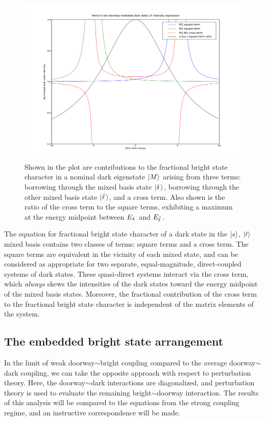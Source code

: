 \begin{figure}
  \caption{Shown in the plot are contributions to the fractional
    bright state character in a nominal dark eigenstate $\mathinner{|{M}\rangle}$
    arising from three terms: borrowing through the mixed basis state
    $\mathinner{|{\tilde{s}\,}\rangle}$, borrowing through the other mixed basis state
    $\mathinner{|{\tilde{\ell}\,}\rangle}$, and a cross term.  Also shown is the ratio of the
    cross term to the square terms, exhibiting a maximum at the energy
    midpoint between $E_{\tilde{s}\,}$ and $E_{\tilde{\ell}\,}$.}
  \label{fig:local-cross-term}
  \includegraphics[width=8in, angle=90]{local-doorway-terms.png}
\end{figure}

The equation for fractional bright state character of a dark state in
the $\mathinner{|{s}\rangle}$, $\mathinner{|{\ell}\rangle}$ mixed basis contains two classes of terms:
square terms and a cross term. The square terms are equivalent in the
vicinity of each mixed state, and can be considered as appropriate for
two separate, equal-magnitude, direct-coupled systems of dark
states. These quasi-direct systems interact via the cross term, which
\emph{always} skews the intensities of the dark states toward the
energy midpoint of the mixed basis states. Moreover, the fractional
contribution of the cross term to the fractional bright state
character is independent of the matrix elements of the system.

\subsection{The embedded bright state arrangement}
\label{sec:ebsa}

In the limit of weak doorway$\sim$bright coupling compared to the average
doorway$\sim$dark coupling, we can take the opposite approach with respect
to perturbation theory. Here, the doorway$\sim$dark interactions are
diagonalized, and perturbation theory is used to evaluate the
remaining bright$\sim$doorway interaction. The results of this analysis
will be compared to the equations from the strong coupling regime, and
an instructive correspondence will be made.

